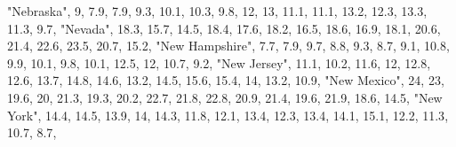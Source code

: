 \documentclass[
]{book}
\newenvironment{Shaded}{\begin{snugshade}}{\end{snugshade}}
\newcommand{\DecValTok}[1]{\textcolor[rgb]{0.00,0.00,0.81}{#1}}
\newcommand{\FloatTok}[1]{\textcolor[rgb]{0.00,0.00,0.81}{#1}}
\newcommand{\NormalTok}[1]{#1}
\newcommand{\StringTok}[1]{\textcolor[rgb]{0.31,0.60,0.02}{#1}}
\begin{document}
\begin{Shaded}
\begin{Highlighting}[]
              \StringTok{"Nebraska"}\NormalTok{,    }\DecValTok{9}\NormalTok{,  }\FloatTok{7.9}\NormalTok{,  }\FloatTok{7.9}\NormalTok{,  }\FloatTok{9.3}\NormalTok{, }\FloatTok{10.1}\NormalTok{, }\FloatTok{10.3}\NormalTok{,  }\FloatTok{9.8}\NormalTok{,   }\DecValTok{12}\NormalTok{,   }\DecValTok{13}\NormalTok{, }\FloatTok{11.1}\NormalTok{, }\FloatTok{11.1}\NormalTok{, }\FloatTok{13.2}\NormalTok{, }\FloatTok{12.3}\NormalTok{, }\FloatTok{13.3}\NormalTok{, }\FloatTok{11.3}\NormalTok{,  }\FloatTok{9.7}\NormalTok{,}
                \StringTok{"Nevada"}\NormalTok{, }\FloatTok{18.3}\NormalTok{, }\FloatTok{15.7}\NormalTok{, }\FloatTok{14.5}\NormalTok{, }\FloatTok{18.4}\NormalTok{, }\FloatTok{17.6}\NormalTok{, }\FloatTok{18.2}\NormalTok{, }\FloatTok{16.5}\NormalTok{, }\FloatTok{18.6}\NormalTok{, }\FloatTok{16.9}\NormalTok{, }\FloatTok{18.1}\NormalTok{, }\FloatTok{20.6}\NormalTok{, }\FloatTok{21.4}\NormalTok{, }\FloatTok{22.6}\NormalTok{, }\FloatTok{23.5}\NormalTok{, }\FloatTok{20.7}\NormalTok{, }\FloatTok{15.2}\NormalTok{,}
         \StringTok{"New Hampshire"}\NormalTok{,  }\FloatTok{7.7}\NormalTok{,  }\FloatTok{7.9}\NormalTok{,  }\FloatTok{9.7}\NormalTok{,  }\FloatTok{8.8}\NormalTok{,  }\FloatTok{9.3}\NormalTok{,  }\FloatTok{8.7}\NormalTok{,  }\FloatTok{9.1}\NormalTok{, }\FloatTok{10.8}\NormalTok{,  }\FloatTok{9.9}\NormalTok{, }\FloatTok{10.1}\NormalTok{,  }\FloatTok{9.8}\NormalTok{, }\FloatTok{10.1}\NormalTok{, }\FloatTok{12.5}\NormalTok{,   }\DecValTok{12}\NormalTok{, }\FloatTok{10.7}\NormalTok{,  }\FloatTok{9.2}\NormalTok{,}
            \StringTok{"New Jersey"}\NormalTok{, }\FloatTok{11.1}\NormalTok{, }\FloatTok{10.2}\NormalTok{, }\FloatTok{11.6}\NormalTok{,   }\DecValTok{12}\NormalTok{, }\FloatTok{12.8}\NormalTok{, }\FloatTok{12.6}\NormalTok{, }\FloatTok{13.7}\NormalTok{, }\FloatTok{14.8}\NormalTok{, }\FloatTok{14.6}\NormalTok{, }\FloatTok{13.2}\NormalTok{, }\FloatTok{14.5}\NormalTok{, }\FloatTok{15.6}\NormalTok{, }\FloatTok{15.4}\NormalTok{,   }\DecValTok{14}\NormalTok{, }\FloatTok{13.2}\NormalTok{, }\FloatTok{10.9}\NormalTok{,}
            \StringTok{"New Mexico"}\NormalTok{,   }\DecValTok{24}\NormalTok{,   }\DecValTok{23}\NormalTok{, }\FloatTok{19.6}\NormalTok{,   }\DecValTok{20}\NormalTok{, }\FloatTok{21.3}\NormalTok{, }\FloatTok{19.3}\NormalTok{, }\FloatTok{20.2}\NormalTok{, }\FloatTok{22.7}\NormalTok{, }\FloatTok{21.8}\NormalTok{, }\FloatTok{22.8}\NormalTok{, }\FloatTok{20.9}\NormalTok{, }\FloatTok{21.4}\NormalTok{, }\FloatTok{19.6}\NormalTok{, }\FloatTok{21.9}\NormalTok{, }\FloatTok{18.6}\NormalTok{, }\FloatTok{14.5}\NormalTok{,}
              \StringTok{"New York"}\NormalTok{, }\FloatTok{14.4}\NormalTok{, }\FloatTok{14.5}\NormalTok{, }\FloatTok{13.9}\NormalTok{,   }\DecValTok{14}\NormalTok{, }\FloatTok{14.3}\NormalTok{, }\FloatTok{11.8}\NormalTok{, }\FloatTok{12.1}\NormalTok{, }\FloatTok{13.4}\NormalTok{, }\FloatTok{12.3}\NormalTok{, }\FloatTok{13.4}\NormalTok{, }\FloatTok{14.1}\NormalTok{, }\FloatTok{15.1}\NormalTok{, }\FloatTok{12.2}\NormalTok{, }\FloatTok{11.3}\NormalTok{, }\FloatTok{10.7}\NormalTok{,  }\FloatTok{8.7}\NormalTok{,}

\end{Highlighting}
\end{Shaded}
\end{document}
